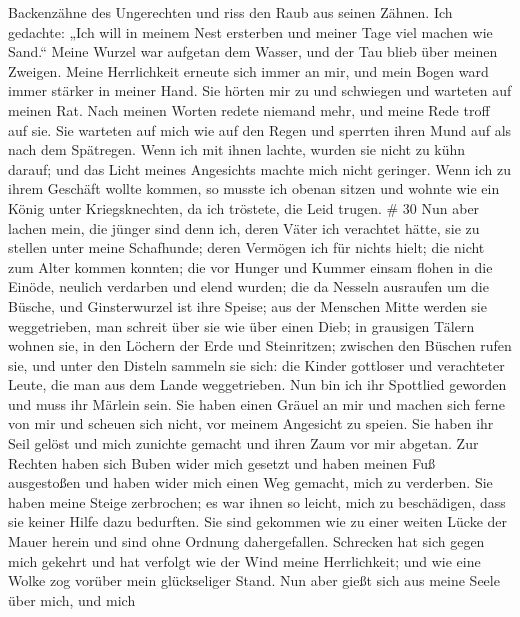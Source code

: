 Backenzähne des Ungerechten und riss den Raub aus seinen Zähnen.
 Ich gedachte: „Ich will in meinem Nest ersterben und
meiner Tage viel machen wie Sand.``  Meine Wurzel war
aufgetan dem Wasser, und der Tau blieb über meinen Zweigen.
 Meine Herrlichkeit erneute sich immer an mir, und mein
Bogen ward immer stärker in meiner Hand.  Sie hörten mir zu
und schwiegen und warteten auf meinen Rat.  Nach meinen
Worten redete niemand mehr, und meine Rede troff auf sie. 
Sie warteten auf mich wie auf den Regen und sperrten ihren Mund auf als
nach dem Spätregen.  Wenn ich mit ihnen lachte, wurden sie
nicht zu kühn darauf; und das Licht meines Angesichts machte mich nicht
geringer.  Wenn ich zu ihrem Geschäft wollte kommen, so
musste ich obenan sitzen und wohnte wie ein König unter Kriegsknechten,
da ich tröstete, die Leid trugen. \# 30  Nun aber lachen
mein, die jünger sind denn ich, deren Väter ich verachtet hätte, sie zu
stellen unter meine Schafhunde;  deren Vermögen ich für
nichts hielt; die nicht zum Alter kommen konnten;  die vor
Hunger und Kummer einsam flohen in die Einöde, neulich verdarben und
elend wurden;  die da Nesseln ausraufen um die Büsche, und
Ginsterwurzel ist ihre Speise;  aus der Menschen Mitte
werden sie weggetrieben, man schreit über sie wie über einen Dieb;
 in grausigen Tälern wohnen sie, in den Löchern der Erde und
Steinritzen;  zwischen den Büschen rufen sie, und unter den
Disteln sammeln sie sich:  die Kinder gottloser und
verachteter Leute, die man aus dem Lande weggetrieben.  Nun
bin ich ihr Spottlied geworden und muss ihr Märlein sein. 
Sie haben einen Gräuel an mir und machen sich ferne von mir und scheuen
sich nicht, vor meinem Angesicht zu speien.  Sie haben ihr
Seil gelöst und mich zunichte gemacht und ihren Zaum vor mir abgetan.
 Zur Rechten haben sich Buben wider mich gesetzt und haben
meinen Fuß ausgestoßen und haben wider mich einen Weg gemacht, mich zu
verderben.  Sie haben meine Steige zerbrochen; es war ihnen
so leicht, mich zu beschädigen, dass sie keiner Hilfe dazu bedurften.
 Sie sind gekommen wie zu einer weiten Lücke der Mauer
herein und sind ohne Ordnung dahergefallen.  Schrecken hat
sich gegen mich gekehrt und hat verfolgt wie der Wind meine
Herrlichkeit; und wie eine Wolke zog vorüber mein glückseliger Stand.
 Nun aber gießt sich aus meine Seele über mich, und mich
